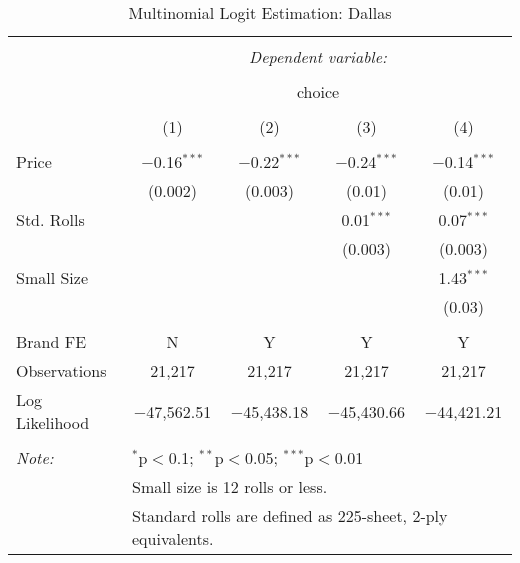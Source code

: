 
\begin{table}[!htbp] \centering 
  \caption{Multinomial Logit Estimation: Dallas} 
  \label{tab:mnlDallasBaseline} 
\begin{tabular}{@{\extracolsep{5pt}}lcccc} 
\\[-1.8ex]\hline 
\hline \\[-1.8ex] 
 & \multicolumn{4}{c}{\textit{Dependent variable:}} \\ 
\cline{2-5} 
\\[-1.8ex] & \multicolumn{4}{c}{choice} \\ 
\\[-1.8ex] & (1) & (2) & (3) & (4)\\ 
\hline \\[-1.8ex] 
 Price & $-$0.16$^{***}$ & $-$0.22$^{***}$ & $-$0.24$^{***}$ & $-$0.14$^{***}$ \\ 
  & (0.002) & (0.003) & (0.01) & (0.01) \\ 
  Std. Rolls &  &  & 0.01$^{***}$ & 0.07$^{***}$ \\ 
  &  &  & (0.003) & (0.003) \\ 
  Small Size &  &  &  & 1.43$^{***}$ \\ 
  &  &  &  & (0.03) \\ 
 \hline \\[-1.8ex] 
Brand FE & N & Y & Y & Y \\ 
Observations & 21,217 & 21,217 & 21,217 & 21,217 \\ 
Log Likelihood & $-$47,562.51 & $-$45,438.18 & $-$45,430.66 & $-$44,421.21 \\ 
\hline 
\hline \\[-1.8ex] 
\textit{Note:}  & \multicolumn{4}{l}{$^{*}$p$<$0.1; $^{**}$p$<$0.05; $^{***}$p$<$0.01} \\ 
 & \multicolumn{4}{l}{Small size is 12 rolls or less.} \\ 
 & \multicolumn{4}{l}{Standard rolls are defined as 225-sheet, 2-ply equivalents.} \\ 
\end{tabular} 
\end{table} 

